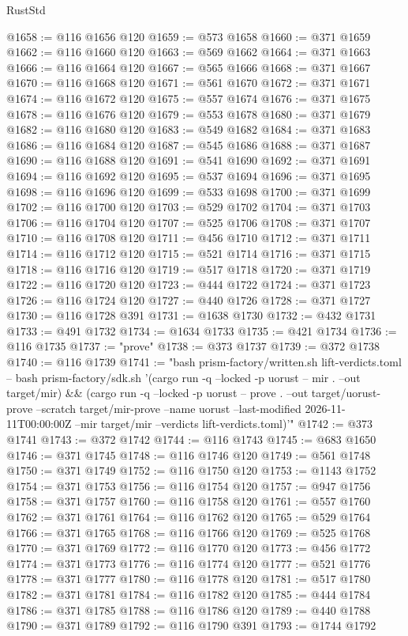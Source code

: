 \begin{lexlean}{RustStd}
\begin{coremodule}
@1658 := @116 @1656 @120
@1659 := @573 @1658
@1660 := @371 @1659
@1662 := @116 @1660 @120
@1663 := @569 @1662
@1664 := @371 @1663
@1666 := @116 @1664 @120
@1667 := @565 @1666
@1668 := @371 @1667
@1670 := @116 @1668 @120
@1671 := @561 @1670
@1672 := @371 @1671
@1674 := @116 @1672 @120
@1675 := @557 @1674
@1676 := @371 @1675
@1678 := @116 @1676 @120
@1679 := @553 @1678
@1680 := @371 @1679
@1682 := @116 @1680 @120
@1683 := @549 @1682
@1684 := @371 @1683
@1686 := @116 @1684 @120
@1687 := @545 @1686
@1688 := @371 @1687
@1690 := @116 @1688 @120
@1691 := @541 @1690
@1692 := @371 @1691
@1694 := @116 @1692 @120
@1695 := @537 @1694
@1696 := @371 @1695
@1698 := @116 @1696 @120
@1699 := @533 @1698
@1700 := @371 @1699
@1702 := @116 @1700 @120
@1703 := @529 @1702
@1704 := @371 @1703
@1706 := @116 @1704 @120
@1707 := @525 @1706
@1708 := @371 @1707
@1710 := @116 @1708 @120
@1711 := @456 @1710
@1712 := @371 @1711
@1714 := @116 @1712 @120
@1715 := @521 @1714
@1716 := @371 @1715
@1718 := @116 @1716 @120
@1719 := @517 @1718
@1720 := @371 @1719
@1722 := @116 @1720 @120
@1723 := @444 @1722
@1724 := @371 @1723
@1726 := @116 @1724 @120
@1727 := @440 @1726
@1728 := @371 @1727
@1730 := @116 @1728 @391
@1731 := @1638 @1730
@1732 := @432 @1731
@1733 := @491 @1732
@1734 := @1634 @1733
@1735 := @421 @1734
@1736 := @116 @1735
@1737 := "prove"
@1738 := @373 @1737
@1739 := @372 @1738
@1740 := @116 @1739
@1741 := "bash prism-factory/written.sh lift-verdicts.toml -- bash prism-factory/sdk.sh '(cargo run -q --locked -p uorust -- mir . --out target/mir) && (cargo run -q --locked -p uorust -- prove . --out target/uorust-prove --scratch target/mir-prove --name uorust --last-modified 2026-11-11T00:00:00Z --mir target/mir --verdicts lift-verdicts.toml)'"
@1742 := @373 @1741
@1743 := @372 @1742
@1744 := @116 @1743
@1745 := @683 @1650
@1746 := @371 @1745
@1748 := @116 @1746 @120
@1749 := @561 @1748
@1750 := @371 @1749
@1752 := @116 @1750 @120
@1753 := @1143 @1752
@1754 := @371 @1753
@1756 := @116 @1754 @120
@1757 := @947 @1756
@1758 := @371 @1757
@1760 := @116 @1758 @120
@1761 := @557 @1760
@1762 := @371 @1761
@1764 := @116 @1762 @120
@1765 := @529 @1764
@1766 := @371 @1765
@1768 := @116 @1766 @120
@1769 := @525 @1768
@1770 := @371 @1769
@1772 := @116 @1770 @120
@1773 := @456 @1772
@1774 := @371 @1773
@1776 := @116 @1774 @120
@1777 := @521 @1776
@1778 := @371 @1777
@1780 := @116 @1778 @120
@1781 := @517 @1780
@1782 := @371 @1781
@1784 := @116 @1782 @120
@1785 := @444 @1784
@1786 := @371 @1785
@1788 := @116 @1786 @120
@1789 := @440 @1788
@1790 := @371 @1789
@1792 := @116 @1790 @391
@1793 := @1744 @1792

\end{coremodule}
\end{lexlean}
